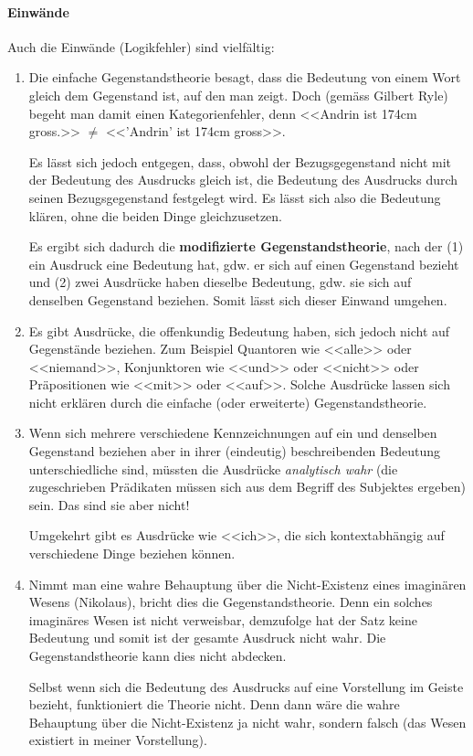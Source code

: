 \documentclass[../main.tex]{subfiles}
\begin{document}
\paragraph{Einwände} Auch die Einwände (Logikfehler) sind vielfältig:
\begin{enumerate}
	\item 
		Die einfache Gegenstandstheorie besagt, dass die Bedeutung von einem Wort gleich dem Gegenstand ist, auf den man zeigt. Doch (gemäss Gilbert Ryle) begeht man damit einen Kategorienfehler, denn <<Andrin ist 174cm gross.>> $\neq$ <<'Andrin' ist 174cm gross>>.

		Es lässt sich jedoch entgegen, dass, obwohl der Bezugsgegenstand nicht mit der Bedeutung des Ausdrucks gleich ist, die Bedeutung des Ausdrucks durch seinen Bezugsgegenstand festgelegt wird. Es lässt sich also die Bedeutung klären, ohne die beiden Dinge gleichzusetzen.
		
		Es ergibt sich dadurch die \textbf{modifizierte Gegenstandstheorie}, nach der (1) ein Ausdruck eine Bedeutung hat, gdw. er sich auf einen Gegenstand bezieht und (2) zwei Ausdrücke haben dieselbe Bedeutung, gdw. sie sich auf denselben Gegenstand beziehen. Somit lässt sich dieser Einwand umgehen.
	
	\item 
		Es gibt Ausdrücke, die offenkundig Bedeutung haben, sich jedoch nicht auf Gegenstände beziehen. Zum Beispiel Quantoren wie <<alle>> oder <<niemand>>, Konjunktoren wie <<und>> oder <<nicht>> oder Präpositionen wie <<mit>> oder <<auf>>. Solche Ausdrücke lassen sich nicht erklären durch die einfache (oder erweiterte) Gegenstandstheorie.
	\item \label{EinwandDerMehrdeutigenBeschreibungGegenstandstheorie}
		Wenn sich mehrere verschiedene Kennzeichnungen auf ein und denselben Gegenstand beziehen aber in ihrer (eindeutig) beschreibenden Bedeutung unterschiedliche sind, müssten die Ausdrücke \textit{analytisch wahr} (die zugeschrieben Prädikaten müssen sich aus dem Begriff des Subjektes ergeben) sein. Das sind sie aber nicht!
		
		Umgekehrt gibt es Ausdrücke wie <<ich>>, die sich kontextabhängig auf verschiedene Dinge beziehen können.
	\item 
		Nimmt man eine wahre Behauptung über die Nicht-Existenz eines imaginären Wesens (Nikolaus), bricht dies die Gegenstandstheorie. Denn ein solches imaginäres Wesen ist nicht verweisbar, demzufolge hat der Satz keine Bedeutung und somit ist der gesamte Ausdruck nicht wahr. Die Gegenstandstheorie kann dies nicht abdecken.
		
		Selbst wenn sich die Bedeutung des Ausdrucks auf eine Vorstellung im Geiste bezieht, funktioniert die Theorie nicht. Denn dann wäre die wahre Behauptung über die Nicht-Existenz ja nicht wahr, sondern falsch (das Wesen existiert in meiner Vorstellung).
\end{enumerate}
\end{document}
